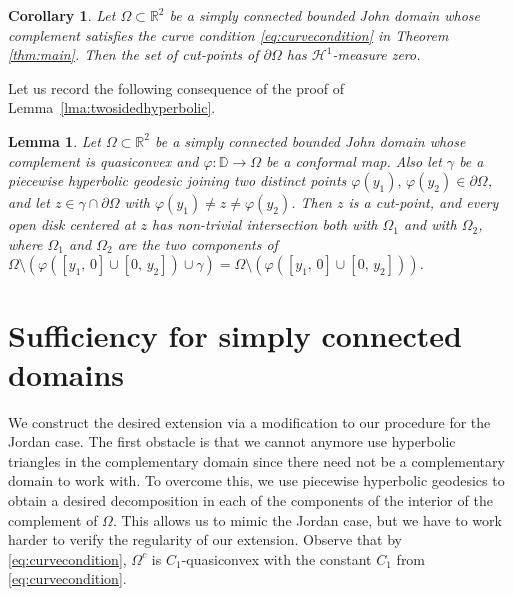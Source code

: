 \documentclass[reqno,11pt]{amsart}
\makeatletter
\def\rr{{\mathbb R}}
\def\ch{{\mathcal H}}
\newtheorem{lem}[thm]{Lemma}%
\newtheorem{cor}[thm]{Corollary}%
\numberwithin{equation}{section}
\theoremstyle{remark}
\makeatother
\begin{document}
\begin{cor}\label{cor:twosidedzeromeasure}
 Let $\Omega \subset \rr^2$ be a simply connected bounded John domain whose 
complement 
 satisfies the curve condition \eqref{eq:curvecondition} in Theorem 
\ref{thm:main}.
 Then the set of cut-points of $\partial \Omega$ 
has $\ch^1$-measure zero.
\end{cor}

Let us record the following consequence of the proof of Lemma~\ref{lma:twosidedhyperbolic}. 

\begin{lem}\label{two side cut point}
Let $\Omega \subset \rr^2$ be a simply connected bounded John domain whose complement is quasiconvex and $\varphi \colon \mathbb D \to \Omega$ be a conformal map. 
Also let $\gamma$ be a piecewise hyperbolic geodesic joining two distinct points $\varphi(y_1),\,\varphi(y_2)\in \partial \Omega$, and let $z\in \gamma \cap \partial \Omega$ with $\varphi(y_1)\neq z \neq \varphi(y_2)$. Then $z$ is a cut-point, and every open disk centered at $z$ has non-trivial intersection both with $\Omega_1$ and with $\Omega_2$, where $\Omega_1$ and $\Omega_2$ are the two components of $\Omega\setminus(\varphi([y_1,\,0]\cup[0,\,y_2]) \cup \gamma) = \Omega\setminus(\varphi([y_1,\,0]\cup[0,\,y_2]))$. 
\end{lem}

\section{Sufficiency for simply connected domains}\label{sec:sufficiency}

We construct the desired extension via a modification to our procedure
for the Jordan case. The first obstacle is that we cannot anymore use
hyperbolic triangles in the complementary domain since there need not be
a complementary domain to work with. To overcome this, we use piecewise
hyperbolic geodesics to obtain a desired decomposition in each of the 
components of the interior of the
complement of $\Omega.$ This allows us to mimic the Jordan case, but we have
to work harder to verify the regularity of our extension. 
Observe that by \eqref{eq:curvecondition}, $\Omega^c$ is $C_1$-quasiconvex with the constant $C_1$ from \eqref{eq:curvecondition}.
\end{document}
